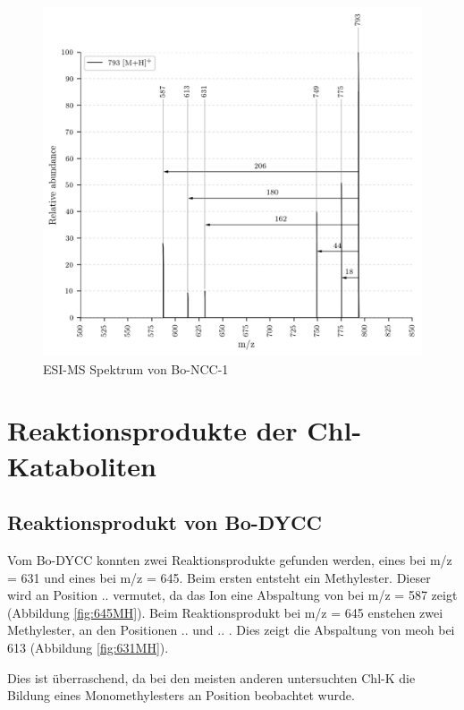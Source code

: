 \begin{figure}[!htbp]
  \centering
  \includegraphics[width=\textwidth, height=0.7\textwidth]{figures/Kapitel7/Kataboliten/VWA_MS_793.png}
  \caption[ESI-MS Spektrum von Bo-NCC-1, Quelle: Autor]{ESI-MS Spektrum von Bo-NCC-1}
  \label{fig:793MH}
\end{figure}



\section{Reaktionsprodukte der Chl-Kataboliten}

\subsection{Reaktionsprodukt von Bo-DYCC}

Vom Bo-DYCC konnten zwei Reaktionsprodukte gefunden werden, eines bei m/z = 631 und eines bei m/z = 645. Beim ersten entsteht ein Methylester. Dieser wird an Position .. vermutet, da das Ion eine Abspaltung von  bei m/z = 587 zeigt (Abbildung \ref{fig:645MH}). Beim Reaktionsprodukt bei m/z = 645 enstehen zwei Methylester, an den Positionen .. und .. .  Dies zeigt die Abspaltung von \gls{meoh} bei 613 (Abbildung \ref{fig:631MH}). 

Dies ist überraschend, da bei den meisten anderen untersuchten \gls{Chl-K} die Bildung eines Monomethylesters an Position beobachtet wurde.

